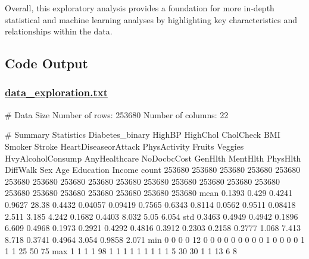 \documentclass[11pt]{article}
\begin{document}
Overall, this exploratory analysis provides a foundation for more in-depth statistical and machine learning analyses by highlighting key characteristics and relationships within the data.

\subsection{Code Output}
\hypertarget{file-data-exploration-txt}{}

\subsubsection*{\hyperlink{code-data-exploration-txt}{data\_exploration.txt}}

\begin{codeoutput}
# Data Size
Number of rows: 253680
Number of columns: 22

# Summary Statistics
      Diabetes_binary HighBP HighChol CholCheck    BMI Smoker  Stroke HeartDiseaseorAttack PhysActivity Fruits Veggies HvyAlcoholConsump AnyHealthcare NoDocbcCost GenHlth MentHlth PhysHlth DiffWalk    Sex    Age Education Income
count          253680 253680   253680    253680 253680 253680  253680               253680       253680 253680  253680            253680        253680      253680  253680   253680   253680   253680 253680 253680    253680 253680
mean           0.1393  0.429   0.4241    0.9627  28.38 0.4432 0.04057              0.09419       0.7565 0.6343  0.8114            0.0562        0.9511     0.08418   2.511    3.185    4.242   0.1682 0.4403  8.032      5.05  6.054
std            0.3463 0.4949   0.4942    0.1896  6.609 0.4968  0.1973               0.2921       0.4292 0.4816  0.3912            0.2303        0.2158      0.2777   1.068    7.413    8.718   0.3741 0.4964  3.054    0.9858  2.071
min                 0      0        0         0     12      0       0                    0            0      0       0                 0             0           0       1        0        0        0      0      1         1      1
25%
50%
75%
max                 1      1        1         1     98      1       1                    1            1      1       1                 1             1           1       5       30       30        1      1     13         6      8


\end{codeoutput}
\end{document}
